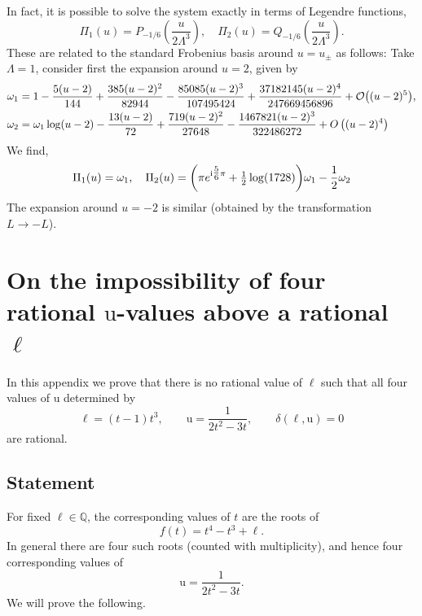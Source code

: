 \documentclass[11pt, a4paper]{article}
\newcommand{\ii}{\mathrm{i}}
\newcommand{\ur}{\mathrm{u}}
\numberwithin{equation}{section}
\begin{document}
In fact, it is possible to solve the system exactly in terms of Legendre functions,
\begin{equation}
  \Pi_1(u) = P_{-1/6}\!\left(\frac{u}{2\Lambda^3}\right), \quad \Pi_2(u) = Q_{-1/6}\!\left(\frac{u}{2\Lambda^3}\right).
\end{equation}
These are related to the standard Frobenius basis around $u = u_{\pm}$ as follows: Take $\Lambda = 1$, consider first the expansion around $u = 2$, given by
\begin{align}
  \omega_1 &= 1-\frac{5 (u-2)}{144}+\frac{385 (u-2)^2}{82944}-\frac{85085 (u-2)^3}{107495424}+\frac{37182145 (u-2)^4}{247669456896}+\mathcal{O}\qty((u-2)^5), \\
  \omega_2 &= \omega_1 \log(u-2)  -\frac{13 (u-2)}{72}+\frac{719 (u-2)^2}{27648}-\frac{1467821 (u-2)^3}{322486272}+O\left((u-2)^4\right)
\end{align}
We find,
\begin{equation}
  \Pi_1(u) = \omega_1, \quad \Pi_2(u) = \qty(\pi e^{\ii \tfrac56 \pi} + \tfrac{1}{2} \log(1728)) \omega_1 - \frac{1}{2} \omega_2
\end{equation}
The expansion around $u = -2$ is similar (obtained by the transformation $L \to -L$).


\section{On the impossibility of four rational \texorpdfstring{$\ur$}{u}-values above a rational \texorpdfstring{$\ell$}{l}}

In this appendix we prove that there is no rational value of \(\ell\) such that all four values of \(\ur\) determined by
\begin{equation}
\ell = (t-1)t^3,
\qquad
\ur = \frac{1}{2t^2-3t}, \qquad \delta(\ell, \ur) = 0
\end{equation}
are rational.

\subsection*{Statement}

For fixed \(\ell\in \mathbb{Q}\), the corresponding values of \(t\) are the roots of
\begin{equation}
f(t) = t^4-t^3+\ell.
\end{equation}
In general there are four such roots (counted with multiplicity), and hence four corresponding values of
\begin{equation}
\ur = \frac{1}{2t^2-3t}.
\end{equation}
We will prove the following.
\end{document}
